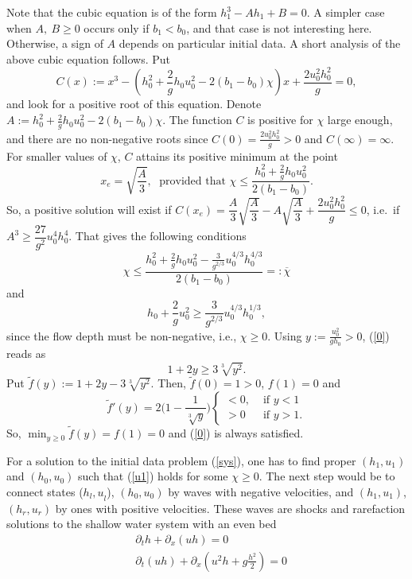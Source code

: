 \documentclass{article}
\theoremstyle{plain}
\theoremstyle{definition}
\theoremstyle{remark}
\begin{document}
Note that the cubic equation is of the form 
\( h_{1}^{3} - Ah_{1} + B = 0 \). A simpler case when  \( A,\ B \geq 0\)
occurs only if \(b_{1} < b_{0}\), and that case  is not interesting here. 
Otherwise, a sign of \(A\) depends on particular initial
data. A short analysis of the above cubic equation follows.
Put 
\[
C(x):=x^{3}-\left( h_{0}^{2}+\frac{2}{g}h_{0}u_{0}^{2}-2(b_{1}-b_{0})\chi\right)x
+\frac{2u_{0}^{2}h_{0}^{2}}{g}=0,
\]
and look for a positive root of this equation. 
Denote $A:=h_{0}^{2}+\frac{2}{g}h_{0}u_{0}^{2}-2(b_{1}-b_{0})\chi$.
The function $C$ is positive for $\chi$
large enough, and there are no non-negative roots since
$C(0)=\frac{2u_{0}^{2}h_{0}^{2}}{g}>0$ and $C(\infty)=\infty$. 
For smaller values of $\chi$, $C$ attains its positive minimum at the point
\[
x_{e}=\sqrt{\frac{A}{3}},\; \text{ provided that }\chi
\leq \frac{h_{0}^{2}+\frac{2}{g}h_{0}u_{0}^{2}}
{2(b_{1}-b_{0})}.
\]
So, a positive solution will exist if 
$C(x_{e})=\dfrac{A}{3}\sqrt{\dfrac{A}{3}}-A\sqrt{\dfrac{A}{3}}
+\dfrac{2u_{0}^{2}h_{0}^{2}}{g} \leq 0$, i.e.\ if $A^{3}\geq 
\dfrac{27}{g^{2}}u_{0}^{4}h_{0}^{4}$. That gives the following conditions
\begin{equation} \label{chi}
\chi \leq  \frac{h_{0}^{2}+\frac{2}{g}h_{0}u_{0}^{2}-\frac{3}{g^{2/3}}
u_{0}^{4/3}h_{0}^{4/3}}{2(b_{1}-b_{0})}=:\overline{\chi}
\end{equation}
and
\begin{equation} \label{0}
h_{0}+\frac{2}{g}u_{0}^{2}  \geq  \frac{3}{g^{2/3}}
u_{0}^{4/3}h_{0}^{1/3},
\end{equation}
since the flow depth must be non-negative, i.e., $\chi \geq 0$.
Using $y:=\frac{u_0^2}{gh_0}>0$, (\ref{0}) reads as
\[1+2y\geq 3\sqrt[3]{y^2}.\]
Put $\tilde{f}(y):=1+2y-3\sqrt[3]{y^2}.$ Then, $\tilde{f}(0)=1>0$, $f(1)=0$ and 
\[\tilde{f}'(y)=2\Big(1-\frac{1}{\sqrt[3]{y}}\Big)\begin{cases}
<0, & \text{ if } y<1\\
>0 & \text{ if } y>1.
\end{cases}\]
So, $\min_{y\geq 0} \tilde{f}(y)=f(1)=0$ and (\ref{0}) is always satisfied.




For a solution to the initial data problem (\ref{sys}), one has to find proper
\( (h_{1},u_{1}) \) and \( (h_{0}, u_{0}) \) such that (\ref{u1}) holds  for some \(\chi \geq 0\). 
The next step would be to connect states (\(h_{l}{,u}_{l}\)), 
\((h_{0},u_{0})\) by waves with negative velocities, 
and \( (h_{1},u_{1}) \), \( (h_{r},u_{r})\)
by ones with positive velocities. These waves are
shocks and rarefaction solutions to the shallow water system with an even bed
\begin{equation} \label{even}
\begin{split}   & \partial_{t}h + \partial_{x}(uh) =  0 \\
& \partial_{t}(uh) + \partial_{x}\left( u^{2}h + g\frac{h^{2}}{2} \right) =  0
\end{split}
\end{equation}
\end{document}
